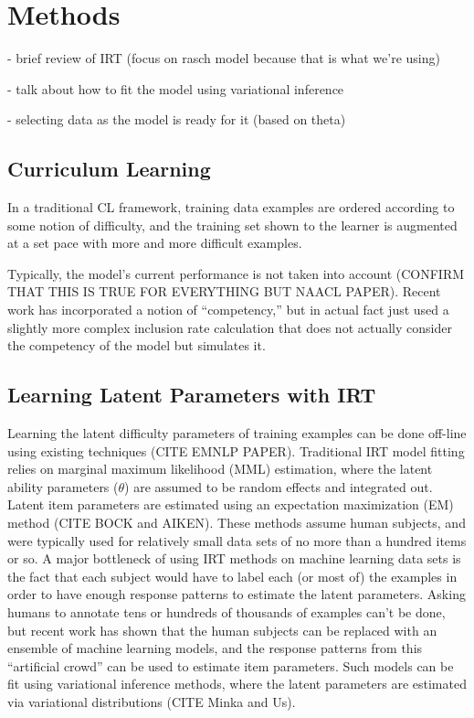 \documentclass[letterpaper]{article} %
\begin{document}
\section{Methods}

- brief review of IRT (focus on rasch model because that is what we're using)

- talk about how to fit the model using variational inference

- selecting data as the model is ready for it (based on theta)
\subsection{Curriculum Learning}
In a traditional CL framework, training data examples are ordered according to some notion of difficulty, and the training set shown to the learner is augmented at a set pace with more and more difficult examples.

Typically, the model's current performance is not taken into account (CONFIRM THAT THIS IS TRUE FOR EVERYTHING BUT NAACL PAPER). Recent work has incorporated a notion of ``competency,'' but in actual fact just used a slightly more complex inclusion rate calculation that does not actually consider the competency of the model but simulates it.

\subsection{Learning Latent Parameters with IRT}
Learning the latent difficulty parameters of training examples can be done off-line using existing techniques (CITE EMNLP PAPER).
Traditional IRT model fitting relies on marginal maximum likelihood (MML) estimation, where the latent ability parameters ($\theta$) are assumed to be random effects and integrated out.
Latent item parameters are estimated using an expectation maximization (EM) method (CITE BOCK and AIKEN).
These methods assume human subjects, and were typically used for relatively small data sets of no more than a hundred items or so.
A major bottleneck of using IRT methods on machine learning data sets is the fact that each subject would have to label each (or most of) the examples in order to have enough response patterns to estimate the latent parameters.
Asking humans to annotate tens or hundreds of thousands of examples can't be done, but recent work has shown that the human subjects can be replaced with an ensemble of machine learning models, and the response patterns from this ``artificial crowd'' can be used to estimate item parameters.
Such models can be fit using variational inference methods, where the latent parameters are estimated via variational distributions (CITE Minka and Us). 
\end{document}
